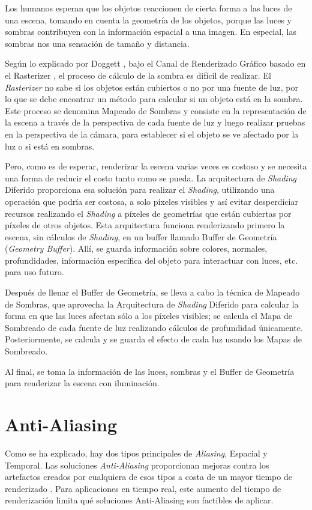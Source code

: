 \documentclass[pregrado]{tesis-usb} %
\begin{document}
Los humanos esperan que los objetos reaccionen de cierta forma a las luces de una escena, tomando en cuenta la geometría de los objetos, porque las luces y sombras contribuyen con la información espacial a una imagen. En especial, las sombras nos una sensación de tamaño y distancia.

Según lo explicado por Doggett \cite{Doggett2017EDAN35}, bajo el Canal de Renderizado Gráfico basado en el Rasterizer , el proceso de cálculo de la sombra es difícil de realizar. El \textit{Rasterizer} no sabe si los objetos están cubiertos o no por una fuente de luz, por lo que se debe encontrar un método para calcular si un objeto está en la sombra. Este proceso se denomina Mapeado de Sombras y consiste en la representación de la escena a través de la perspectiva de cada fuente de luz y luego realizar pruebas en la perspectiva de la cámara, para establecer si el objeto se ve afectado por la luz o si está en sombras.

Pero, como es de esperar, renderizar la escena varias veces es costoso y se necesita una forma de reducir el costo tanto como se pueda. La arquitectura de \textit{Shading} Diferido proporciona esa solución para realizar el \textit{Shading}, utilizando una operación que podría ser costosa, a solo píxeles visibles y así evitar desperdiciar recursos realizando el \textit{Shading} a píxeles de geometrías que están cubiertas por píxeles de otros objetos. Esta arquitectura funciona renderizando primero la escena, sin cálculos de \textit{Shading}, en un buffer llamado Buffer de Geometría (\textit{Geometry Buffer}). Allí, se guarda información sobre colores, normales, profundidades, información específica del objeto para interactuar con luces, etc. para uso futuro. 

Después de llenar el Buffer de Geometría, se lleva a cabo la técnica de Mapeado de Sombras, que aprovecha la Arquitectura de \textit{Shading} Diferido para calcular la forma en que las luces afectan sólo a los píxeles visibles; se calcula el Mapa de Sombreado de cada fuente de luz realizando cálculos de profundidad únicamente. Posteriormente, se calcula y se guarda el efecto de cada luz usando los Mapas de Sombreado.

Al final, se toma la información de las luces, sombras y el Buffer de Geometría para renderizar la escena con iluminación.


\section{Anti-Aliasing}
Como se ha explicado, hay dos tipos principales de \textit{Aliasing}, Espacial y Temporal. Las soluciones \textit{Anti-Aliasing} proporcionan mejoras contra los artefactos creados por cualquiera de esos tipos a costa de un mayor tiempo de renderizado \cite{Doggett2017EDAN35}. Para aplicaciones en tiempo real, este aumento del tiempo de renderización limita qué soluciones Anti-Aliasing son factibles de aplicar.
\end{document}
